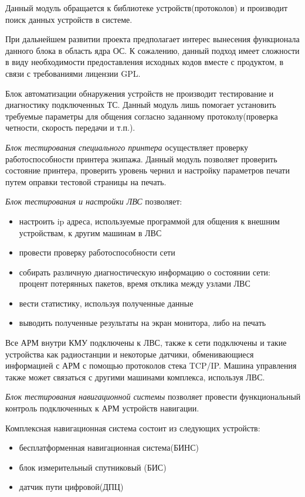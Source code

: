 Данный модуль обращается к библиотеке устройств(протоколов) и производит поиск данных устройств в системе.

При дальнейшем развитии проекта предполагает интерес вынесения функционала данного блока в область ядра ОС. К сожалению,
данный подход имеет сложности в виду необходимости предоставления исходных кодов вместе с продуктом, в связи с
требованиями лицензии GPL.

Блок автоматизации обнаружения устройств не производит тестирование и диагностику подключенных ТС. Данный модуль лишь
помогает установить требуемые параметры для общения согласно заданному протоколу(проверка четности, скорость передачи и
т.п.).

\textit{Блок тестирования специального принтера} осуществляет проверку работоспособности принтера экипажа. Данный модуль
позволяет проверить состояние принтера, проверить уровень чернил и настройку параметров печати путем оправки тестовой
страницы на печать.

\textit{Блок тестирования и настройки ЛВС} позволяет:
\begin{itemize}
	\item настроить ip адреса, используемые программой для общения к внешним устройствам, к другим машинам в
		ЛВС
	\item провести проверку работоспособности сети
	\item собирать различную диагностическую информацию о состоянии сети: процент потерянных
		пакетов, время отклика между узлами ЛВС
	\item вести статистику, используя полученные данные
	\item выводить полученные результаты на экран монитора, либо на печать
\end{itemize}

Все АРМ внутри КМУ подключены к ЛВС, также к сети подключены и такие устройства как радиостанции и некоторые датчики,
обменивающиеся информацией с АРМ с помощью протоколов стека TCP/IP.
Машина управления также может связаться с другими машинами комплекса, используя ЛВС.

\textit{Блок тестирования навигационной системы} позволяет провести функциональный контроль подключенных к АРМ устройств
навигации.

Комплексная навигационная система состоит из следующих устройств:
\begin{itemize}
	\item бесплатформенная навигационная система(БИНС)
	\item блок измерительный спутниковый (БИС)
	\item датчик пути цифровой(ДПЦ)
\end{itemize}

